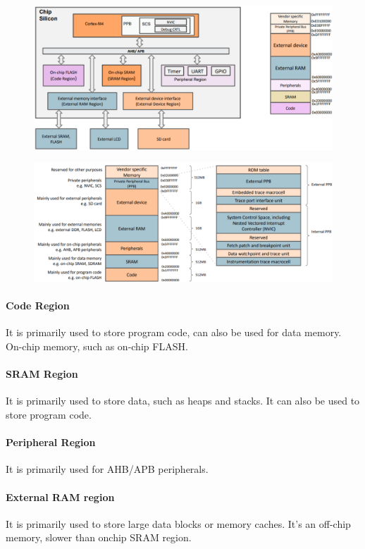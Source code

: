 \begin{figure}[H]
    \centering
    \includegraphics[width=1\linewidth]{img/image20.png}
\end{figure}


\begin{figure}[H]
    \centering
    \includegraphics[width=1\linewidth]{img/image21.png}
\end{figure}


\paragraph{Code Region} It is primarily used to store program code, can also be used for data memory.
On-chip memory, such as on-chip FLASH.

\paragraph{SRAM Region} It is primarily used to store data, such as heaps and stacks. It can also be used to store program code.

\paragraph{Peripheral Region} It is primarily used for AHB/APB peripherals.
\paragraph{External RAM region} It is primarily used to store large data blocks or memory caches. It's an off-chip memory, slower than onchip SRAM region.
